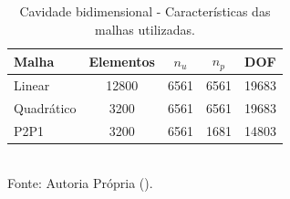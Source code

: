 \begin{table}[h!]
    \centering
    \caption{Cavidade bidimensional - Características das malhas utilizadas.}
    \begin{tabular}{lcccc}
        \hline
        Malha      & Elementos & $n_u$ & $n_p$ & DOF   \\\hline
        Linear     & 12800     & 6561  & 6561  & 19683 \\
        Quadrático & 3200      & 6561  & 6561  & 19683 \\
        P2P1       & 3200      & 6561  & 1681  & 14803 \\\hline
    \end{tabular}
    \\Fonte: Autoria Própria (\the\year).
    \label{tab:cavity-mesh}
\end{table}

